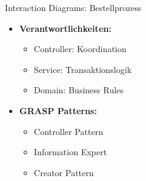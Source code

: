 \begin{example2}{Interaction Diagrams: Bestellprozess}
\begin{itemize}
    \item \textbf{Verantwortlichkeiten:}
    \begin{itemize}
        \item Controller: Koordination
        \item Service: Transaktionslogik
        \item Domain: Business Rules
    \end{itemize}
    
    \item \textbf{GRASP Patterns:}
    \begin{itemize}
        \item Controller Pattern
        \item Information Expert
        \item Creator Pattern
    \end{itemize}
\end{itemize}
\end{example2}